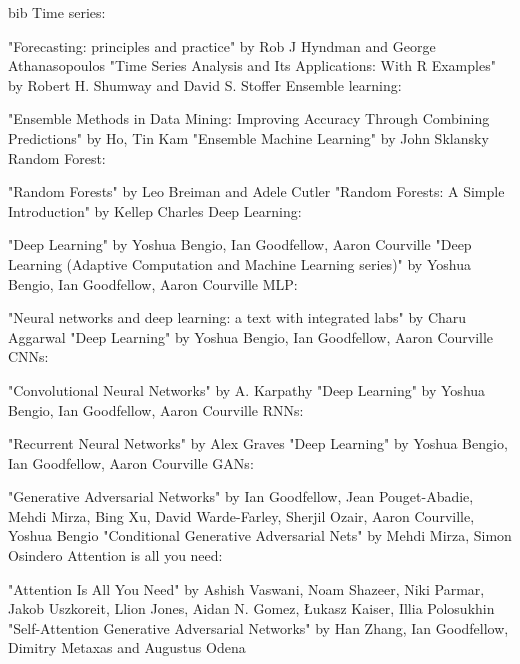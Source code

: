 bib
Time series:

"Forecasting: principles and practice" by Rob J Hyndman and George Athanasopoulos
"Time Series Analysis and Its Applications: With R Examples" by Robert H. Shumway and David S. Stoffer
Ensemble learning:

"Ensemble Methods in Data Mining: Improving Accuracy Through Combining Predictions" by Ho, Tin Kam
"Ensemble Machine Learning" by John Sklansky
Random Forest:

"Random Forests" by Leo Breiman and Adele Cutler
"Random Forests: A Simple Introduction" by Kellep Charles
Deep Learning:

"Deep Learning" by Yoshua Bengio, Ian Goodfellow, Aaron Courville
"Deep Learning (Adaptive Computation and Machine Learning series)" by Yoshua Bengio, Ian Goodfellow, Aaron Courville
MLP:

"Neural networks and deep learning: a text with integrated labs" by Charu Aggarwal
"Deep Learning" by Yoshua Bengio, Ian Goodfellow, Aaron Courville
CNNs:

"Convolutional Neural Networks" by A. Karpathy
"Deep Learning" by Yoshua Bengio, Ian Goodfellow, Aaron Courville
RNNs:

"Recurrent Neural Networks" by Alex Graves
"Deep Learning" by Yoshua Bengio, Ian Goodfellow, Aaron Courville
GANs:

"Generative Adversarial Networks" by Ian Goodfellow, Jean Pouget-Abadie, Mehdi Mirza, Bing Xu, David Warde-Farley, Sherjil Ozair, Aaron Courville, Yoshua Bengio
"Conditional Generative Adversarial Nets" by Mehdi Mirza, Simon Osindero
Attention is all you need:

"Attention Is All You Need" by Ashish Vaswani, Noam Shazeer, Niki Parmar, Jakob Uszkoreit, Llion Jones, Aidan N. Gomez, Łukasz Kaiser, Illia Polosukhin
"Self-Attention Generative Adversarial Networks" by Han Zhang, Ian Goodfellow, Dimitry Metaxas and Augustus Odena

